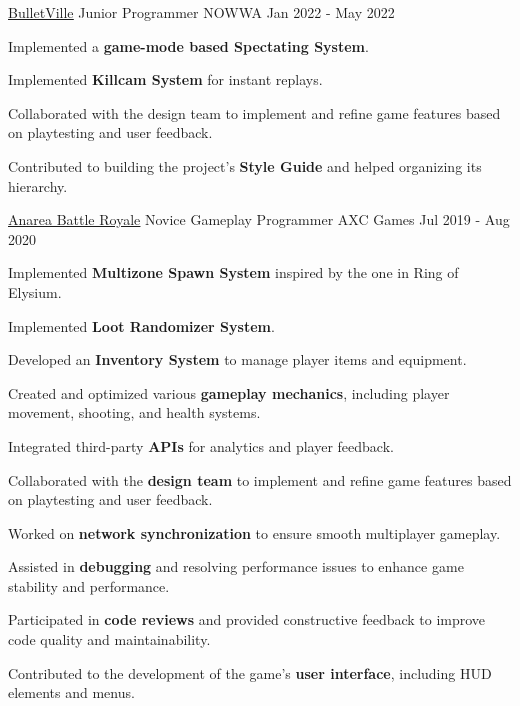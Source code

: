\begin{cventries}
  \cventry
    {\href{https://wizardcell.com/about/bulletville}{\underline{BulletVille}}} %
    {Junior Programmer} %
    {NOWWA} %
    {Jan 2022 - May 2022} %
    {
      \begin{cvitems} %
        \item {Implemented a \textbf{game-mode based Spectating System}.}
        \item {Implemented \textbf{Killcam System} for instant replays.}
        \item {Collaborated with the design team to implement and refine game features based on playtesting and user feedback.}
        \item {Contributed to building the project's \textbf{Style Guide} and helped organizing its hierarchy.}
      \end{cvitems}
    }

  \cventry
    {\href{https://wizardcell.com/about/anarea}{\underline{Anarea Battle Royale}}} %
    {Novice Gameplay Programmer} %
    {AXC Games} %
    {Jul 2019 - Aug 2020} %
    {
      \begin{cvitems} %
        \item {Implemented \textbf{Multizone Spawn System} inspired by the one in Ring of Elysium.}
        \item {Implemented \textbf{Loot Randomizer System}.}
        \item {Developed an \textbf{Inventory System} to manage player items and equipment.}
        \item {Created and optimized various \textbf{gameplay mechanics}, including player movement, shooting, and health systems.}
        \item {Integrated third-party \textbf{APIs} for analytics and player feedback.}
        \item {Collaborated with the \textbf{design team} to implement and refine game features based on playtesting and user feedback.}
        \item {Worked on \textbf{network synchronization} to ensure smooth multiplayer gameplay.}
        \item {Assisted in \textbf{debugging} and resolving performance issues to enhance game stability and performance.}
        \item {Participated in \textbf{code reviews} and provided constructive feedback to improve code quality and maintainability.}
        \item {Contributed to the development of the game's \textbf{user interface}, including HUD elements and menus.}
      \end{cvitems}
    }

\end{cventries}

